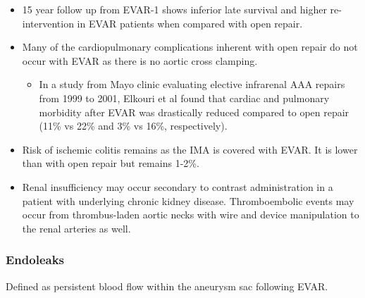 \documentclass[
]{book}
\providecommand{\tightlist}{%
  \setlength{\itemsep}{0pt}\setlength{\parskip}{0pt}}
\begin{document}
\begin{itemize}
\item
  15 year follow up from EVAR-1 shows inferior late survival and
  higher re-intervention in EVAR patients when compared with open
  repair. \citep{patelEndovascularOpenRepair2016}
\item
  Many of the cardiopulmonary complications inherent with open repair
  do not occur with EVAR as there is no aortic cross clamping.

  \begin{itemize}
  \tightlist
  \item
    In a study from Mayo clinic evaluating elective infrarenal AAA
    repairs from 1999 to 2001, Elkouri et al found that cardiac and
    pulmonary morbidity after EVAR was drastically reduced compared
    to open repair (11\% vs 22\% and 3\% vs 16\%, respectively).
    \citep{elkouriPerioperativeComplicationsEarly2004}
  \end{itemize}
\item
  Risk of ischemic colitis remains as the IMA is covered with EVAR. It
  is lower than with open repair but remains 1-2\%.
\item
  Renal insufficiency may occur secondary to contrast administration
  in a patient with underlying chronic kidney disease. Thromboembolic
  events may occur from thrombus-laden aortic necks with wire and
  device manipulation to the renal arteries as well.
\end{itemize}

\hypertarget{endoleaks}{%
\subsubsection{Endoleaks}\label{endoleaks}}

Defined as persistent blood flow within the aneurysm sac following EVAR.
\end{document}
